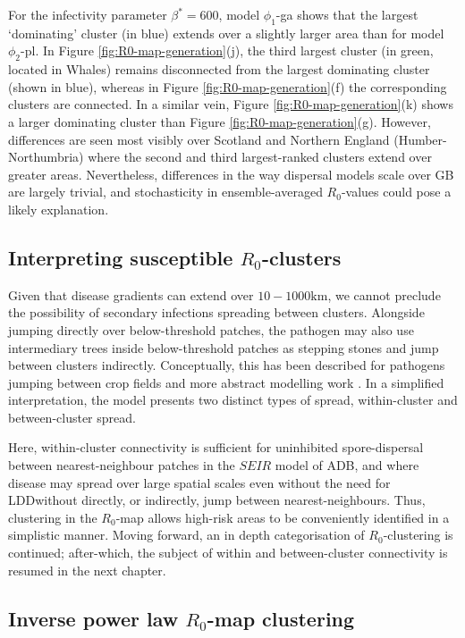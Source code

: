For the infectivity parameter $\beta^*=600$, model $\phi_1$-ga shows that the largest `dominating' cluster (in blue) extends over a slightly larger area than for model $\phi_2$-pl.
In Figure \ref{fig:R0-map-generation}(j), the third largest cluster (in green, located in Whales) remains disconnected from the largest dominating cluster (shown in blue),
whereas in Figure \ref{fig:R0-map-generation}(f) the corresponding clusters are connected. 
In a similar vein, Figure \ref{fig:R0-map-generation}(k) shows a larger dominating cluster than Figure \ref{fig:R0-map-generation}(g).
However, differences are seen most visibly over Scotland and Northern England (Humber-Northumbria) where the second and third largest-ranked clusters extend over greater areas.
Nevertheless, differences in the way dispersal models scale over GB are largely trivial, and stochasticity in ensemble-averaged $R_0$-values could pose a likely explanation.

\subsection{Interpreting susceptible $R_0$-clusters}

Given that disease gradients can extend over $10-1000\mathrm{km}$, we cannot preclude the possibility of secondary infections spreading between clusters.
Alongside jumping directly over below-threshold patches, the pathogen may also use intermediary trees inside below-threshold patches as stepping stones and jump between clusters indirectly. 
Conceptually, this has been described for pathogens jumping between crop fields \cite{Gilligan-disease-management} and more abstract modelling work \cite{wingen2013long}.
In a simplified interpretation, the model presents two distinct types of spread, within-cluster and between-cluster spread. 

Here, within-cluster connectivity is sufficient for uninhibited spore-dispersal between nearest-neighbour patches in the $SEIR$ model of ADB, 
and where disease may spread over large spatial scales even without the need for LDD\textemdash without directly, or indirectly, jump between nearest-neighbours.
Thus, clustering in the $R_0$-map allows high-risk areas to be conveniently identified in a simplistic manner. 
Moving forward, an in depth categorisation of $R_0$-clustering is continued;
after-which, the subject of within and between-cluster connectivity is resumed in the next chapter.

\subsection{Inverse power law $R_0$-map clustering}
\label{sec:inverse-power-law-r0-clustering}


